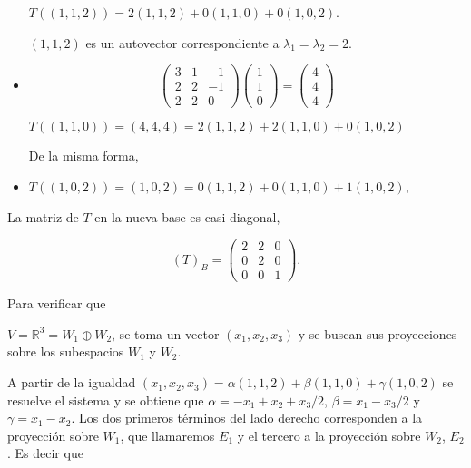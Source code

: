 \begin{example}
\begin{itemize}
 $T((1,1,2))=2(1,1,2)+ 0 (1,1,0) +0(1,0,2)$.

  \bigskip
 
 $(1,1,2)$  es un autovector correspondiente a $\lambda_1=\lambda_2=2$.
 
 

 
  \bigskip  
  
  \item

$$\left(\begin{array}{ccc} 3 & 1 &  -1 \\ 2 & 2 & -1
\\ 2 & 2 & 0
\end{array}
 \right)  \left(\begin{array}{c} 1\\ 1
\\ 0
\end{array}
 \right) =  \left(\begin{array}{c} 4\\ 4
\\ 4
\end{array}
 \right)$$ 

  \bigskip  
  
   $T((1,1,0))=(4,4,4)=2(1,1,2)+2(1,1,0)+0(1,0,2)$ 

  \bigskip

  
  De la misma forma,

   \bigskip

   
  \item
   $T((1,0,2))=(1,0,2)= 0(1,1,2)+0(1,1,0)+1(1,0,2)$,
   
    
\end{itemize}


\bigskip

\noindent
La matriz de $T$ en la nueva base es casi diagonal,

\bigskip

$$(T)_B=\left(\begin{array}{ccc} 2 & 2 &  0 \\ 0 & 2 & 0
\\ 0 & 0 & 1
\end{array}
 \right).$$
 

\bigskip

Para verificar que 


\bigskip


 $V=\mathbb{R}^{3}=W_1 \oplus W_2$, 
\noindent
se toma un vector $(x_1,x_2,x_3)$ y se buscan sus  proyecciones sobre los subespacios $W_1$ y $W_2$.

\bigskip
A partir de la igualdad 
\noindent
$(x_1,x_2,x_3)=  \alpha(1,1,2) + \beta (1,1,0) + \gamma (1,0,2)$
\noindent 
se resuelve el sistema y se obtiene que $\alpha=-x_1+x_2+x_3/2$, $\beta=x_1-x_3/2$ y $\gamma=x_1-x_2$.  Los dos primeros términos del lado derecho corresponden a la proyección sobre $W_1$, que llamaremos $E_1$ y el tercero a la proyección sobre $W_2$, $E_2$. Es decir  que 


\end{example}
